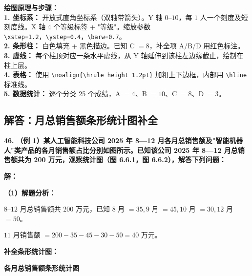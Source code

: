 \vspace{0.4cm}
{\small\color{blue!70!black}
\textbf{绘图原理与步骤：}\\
\textbf{1. 坐标系：} 开放式直角坐标系（双轴带箭头）。Y 轴 $0$--$10$，每 $1$ 人一个刻度及短刻度线。X 轴 4 个等级标签 + "等级"。缩放参数 \texttt{\textbackslash{}xstep=1.2}，\texttt{\textbackslash{}ystep=0.4}，\texttt{\textbackslash{}barw=0.7}。\\
\textbf{2. 条形柱：} 白色填充 + 黑色描边。已知 C $= 8$，补全项 A/B/D 用红色标注。\\
\textbf{3. 虚线：} 每个柱顶对应一条水平虚线，从 Y 轴延伸到该柱左边缘截止，绘制在柱上层。\\
\textbf{4. 表格：} 使用 \texttt{\textbackslash{}noalign\{\textbackslash{}hrule height 1.2pt\}} 加粗上下边框，内部用 \texttt{\textbackslash{}hline} 标准线。\\
\textbf{5. 数据统计：} 逐个分类 25 个成绩，A $= 4$$、$B $= 10$$、$C $= 8$$、$D $= 3$。
}

\newpage

\newpage

\subsection{解答：月总销售额条形统计图补全}

\vspace{0.6cm}

\textbf{\LARGE 46.} \textbf{（例 1）某人工智能科技公司 2025 年 8—12 月各月总销售额及"智能机器人"类产品的各月销售额占比分别如图所示。已知该公司 2025 年 8—12 月总销售额共为 200 万元，观察统计图（图 6.6.1，图 6.6.2），解答下列问题：}

\vspace{0.4cm}
\textbf{解：}

\textbf{（1）解题分析：}

$8$--$12$ 月总销售额共 $200$ 万元，已知 $8$ 月 $= 35, 9$ 月 $= 45, 10$ 月 $= 30, 12$ 月 $= 50$。

$11$ 月销售额 $= 200 - 35 - 45 - 30 - 50 = 40$ 万元。

\vspace{0.2cm}
\textbf{补全条形统计图：}

\begin{center}
{\textbf{各月总销售额条形统计图}}
\end{center}

